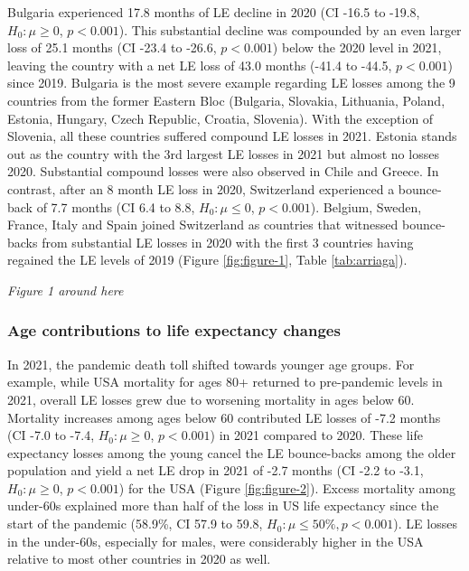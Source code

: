 \documentclass[12pt]{article}
\begin{document}
Bulgaria experienced 17.8 months of LE decline in 2020 (CI -16.5 to -19.8, $H_0: \mu \geq 0$, $p<0.001$). This substantial decline was compounded by an even larger loss of 25.1 months (CI -23.4 to -26.6, $p<0.001$) below the 2020 level in 2021, leaving the country with a net LE loss of 43.0 months (-41.4 to -44.5, $p < 0.001$) since 2019. Bulgaria is the most severe example regarding LE losses among the 9 countries from the former Eastern Bloc (Bulgaria, Slovakia, Lithuania, Poland, Estonia, Hungary, Czech Republic, Croatia, Slovenia). With the exception of Slovenia, all these countries suffered compound LE losses in 2021. Estonia stands out as the country with the 3rd largest LE losses in 2021 but almost no losses 2020. Substantial compound losses were also observed in Chile and Greece. In contrast, after an 8 month LE loss in 2020, Switzerland experienced a bounce-back of 7.7 months (CI 6.4 to  8.8, $H_0: \mu \leq 0$, $p < 0.001$). Belgium, Sweden, France, Italy and Spain joined Switzerland as countries that witnessed bounce-backs from substantial LE losses in 2020 with the first 3 countries having regained the LE levels of 2019 (Figure \ref{fig:figure-1}, Table \ref{tab:arriaga}).

\par\medskip
\emph{Figure 1 around here}
\par\medskip

\subsubsection*{Age contributions to life expectancy changes}

In 2021, the pandemic death toll shifted towards younger age groups. For example, while USA mortality for ages 80+ returned to pre-pandemic levels in 2021, overall LE losses grew due to worsening mortality in ages below 60. Mortality increases among ages below 60 contributed LE losses of -7.2 months (CI -7.0 to -7.4, $H_0: \mu \geq 0$, $p < 0.001$) in 2021 compared to 2020. These life expectancy losses among the young cancel the LE bounce-backs among the older population and yield a net LE drop in 2021 of -2.7 months (CI -2.2 to -3.1, $H_0: \mu \geq 0$, $p < 0.001$) for the USA (Figure \ref{fig:figure-2}). Excess mortality among under-60s explained more than half of the loss in US life expectancy since the start of the pandemic (58.9\%, CI 57.9 to 59.8, $H_0: \mu\leq50\%, p < 0.001$). LE losses in the under-60s, especially for males, were considerably higher in the USA relative to most other countries in 2020 as well.\cite{Aburto2021b}
\end{document}
